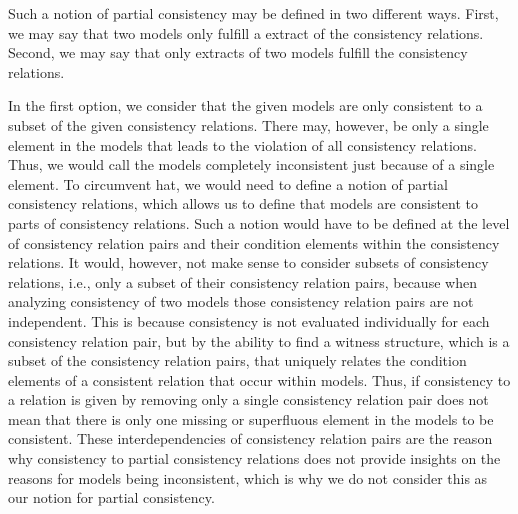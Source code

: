 Such a notion of partial consistency may be defined in two different ways.
First, we may say that two models only fulfill a extract of the consistency relations.
Second, we may say that only extracts of two models fulfill the consistency relations.

In the first option, we consider that the given models are only consistent to a subset of the given consistency relations.
There may, however, be only a single element in the models that leads to the violation of all consistency relations.
Thus, we would call the models completely inconsistent just because of a single element.
To circumvent hat, we would need to define a notion of partial consistency relations, which allows us to define that models are consistent to parts of consistency relations.
Such a notion would have to be defined at the level of consistency relation pairs and their condition elements within the consistency relations.
It would, however, not make sense to consider subsets of consistency relations, i.e., only a subset of their consistency relation pairs, because when analyzing consistency of two models those consistency relation pairs are not independent.
This is because consistency is not evaluated individually for each consistency relation pair, but by the ability to find a witness structure, which is a subset of the consistency relation pairs, that uniquely relates the condition elements of a consistent relation that occur within models.
Thus, if consistency to a relation is given by removing only a single consistency relation pair does not mean that there is only one missing or superfluous element in the models to be consistent.
These interdependencies of consistency relation pairs are the reason why consistency to partial consistency relations does not provide insights on the reasons for models being inconsistent, which is why we do not consider this as our notion for partial consistency.

